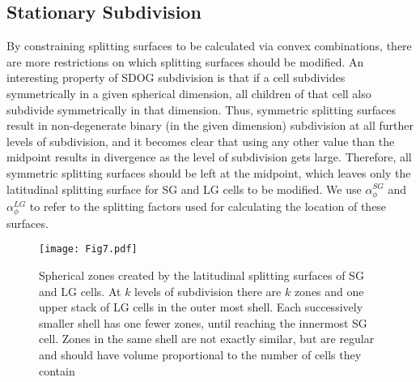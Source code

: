 \subsection{Stationary Subdivision} \label{sec:method-stationary}
By constraining splitting surfaces to be calculated via convex combinations, there are more restrictions on which splitting surfaces should be modified.
An interesting property of SDOG subdivision is that if a cell subdivides symmetrically in a given spherical dimension, all children of that cell also subdivide symmetrically in that dimension.
Thus, symmetric splitting surfaces result in non-degenerate binary (in the given dimension) subdivision at all further levels of subdivision, and it becomes clear that using any other value than the midpoint results in divergence as the level of subdivision gets large.
Therefore, all symmetric splitting surfaces should be left at the midpoint, which leaves only the latitudinal splitting surface for SG and LG cells to be modified.
We use $\alpha_{\phi}^{SG}$ and $\alpha_{\phi}^{LG}$ to refer to the splitting factors used for calculating the location of these surfaces.


\begin{figure}[tbp]
	\texttt{[image: Fig7.pdf]}
	\caption{Spherical zones created by the latitudinal splitting surfaces of SG and LG cells.
		At $k$ levels of subdivision there are $k$ zones and one upper stack of LG cells in the outer most shell.
		Each successively smaller shell has one fewer zones, until reaching the innermost SG cell.
		Zones in the same shell are not exactly similar, but are regular and should have volume proportional to the number of cells they contain}
	\label{fig:lat-splits}
\end{figure}


